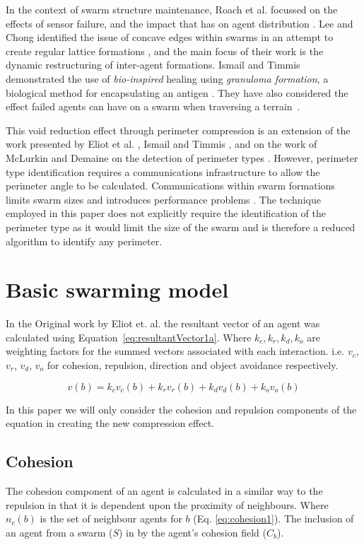 \documentclass[12pt,a4paper]{IEEEtran}
\begin{document}
In the context of swarm structure maintenance, Roach et al. focussed on the effects of sensor failure, and the impact that has on agent distribution \cite{RMT:15}. Lee and Chong identified the issue of concave edges within swarms in an attempt to create regular lattice formations \cite{GN:08}, and the main focus of their work is the dynamic restructuring of inter-agent formations. Ismail and Timmis demonstrated the use of \textit{bio-inspired} healing using \textit{granuloma formation}, a biological method for encapsulating an antigen \cite{IT:10}. They have also considered the effect failed agents can have on a swarm when traversing a terrain~\cite{TIBW:16}. 

This void reduction effect through perimeter compression is an extension of the work presented by Eliot et al. \cite{eliot2019void}, Ismail and Timmis \cite{IT:10,TIBW:16}, and on the work of McLurkin and Demaine on the detection of perimeter types \cite{mclurkin2009}. However, perimeter type identification requires a communications infrastructure to allow the perimeter angle to be calculated. Communications within swarm formations limits swarm sizes and introduces performance problems \cite{fu2020formation}. The technique employed in this paper does not explicitly require the identification of the perimeter type as it would limit the size of the swarm\cite{eliot2019void,GN:08} and is therefore a reduced algorithm to identify any perimeter.

\section{Basic swarming model}\label{basicModel}
In the Original work by Eliot et. al. the resultant vector of an agent was calculated using Equation~\ref{eq:resultantVector1a}. Where $k_c,k_r,k_d,k_o$ are weighting factors for the summed vectors associated with each interaction. i.e. $v_c$, $v_r$, $v_d$, $v_o$ for cohesion, repulsion, direction and object avoidance respectively. 

\begin{equation}\label{eq:resultantVector1a}
	v(b) = k_cv_c(b) + k_rv_r(b) + k_dv_d(b) + k_ov_o(b)
\end{equation}

In this paper we will only consider the cohesion and repulsion components of the equation in creating the new compression effect.

\subsection{Cohesion}\label{cohesion}
The cohesion component of an agent is calculated in a similar way to the repulsion in that it is dependent upon the proximity of neighbours. Where $n_c(b)$ is the set of neighbour agents for $b$ (Eq. \ref{eq:cohesion1}). The inclusion of an agent from a swarm ($S$) in by the agent's cohesion field ($C_b$).
\end{document}
